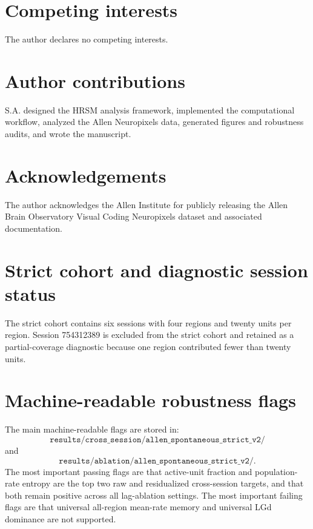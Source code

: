\documentclass[11pt]{article}
\begin{document}
\section*{Competing interests}

The author declares no competing interests.

\section*{Author contributions}

S.A. designed the HRSM analysis framework, implemented the computational workflow, analyzed the Allen Neuropixels data, generated figures and robustness audits, and wrote the manuscript.

\section*{Acknowledgements}

The author acknowledges the Allen Institute for publicly releasing the Allen Brain Observatory Visual Coding Neuropixels dataset and associated documentation.




\appendix

\section{Strict cohort and diagnostic session status}

The strict cohort contains six sessions with four regions and twenty units per region. Session 754312389 is excluded from the strict cohort and retained as a partial-coverage diagnostic because one region contributed fewer than twenty units.

\section{Machine-readable robustness flags}

The main machine-readable flags are stored in:
\[
\texttt{results/cross\_session/allen\_spontaneous\_strict\_v2/}
\]
and
\[
\texttt{results/ablation/allen\_spontaneous\_strict\_v2/}.
\]
The most important passing flags are that active-unit fraction and population-rate entropy are the top two raw and residualized cross-session targets, and that both remain positive across all lag-ablation settings. The most important failing flags are that universal all-region mean-rate memory and universal LGd dominance are not supported.
\end{document}
